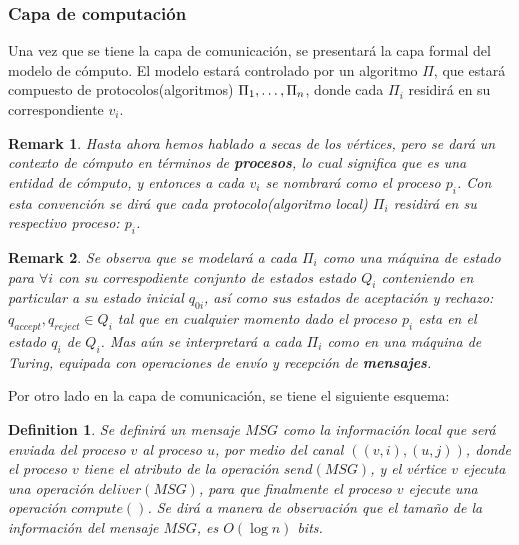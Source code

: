 \documentclass[10pt]{report}
\newtheorem*{remark}{Remark}
\newtheorem{definition}{Definition}
\begin{document}
    \subsubsection{Capa de computación}
    Una vez que se tiene la capa de comunicación, se presentará la capa formal del modelo de
    cómputo.\newline
    El modelo estará controlado por un algoritmo $\Pi$, que estará compuesto de protocolos(algoritmos)
    $\Pi_{1},\mathellipsis,\Pi_{n}$, donde cada $\Pi_{i}$ residirá en su correspondiente $v_{i}$.
    \newline
    \begin{remark}
        Hasta ahora hemos hablado a secas de los vértices, pero se dará un contexto
        de cómputo en términos de \textbf{procesos}, lo cual significa que es una entidad de cómputo, y entonces a cada $v_{i}$
        se nombrará como el proceso $p_{i}$.\newline
        Con esta convención se dirá que cada protocolo(algoritmo local) $\Pi_{i}$ residirá en su respectivo proceso:
        $p_{i}$.

    \end{remark}
        \begin{remark}
        Se observa que se modelará a cada $\Pi_{i}$ como una máquina de estado para $\forall i$ con su
        correspodiente conjunto de estados estado $Q_{i}$ conteniendo en particular a su estado inicial  $q_{0i}$, así como sus estados de
        aceptación y rechazo: $q_{accept},q_{reject}\in Q_{i}$ tal que en cualquier
        momento dado el proceso $p_{i}$ esta en el estado $q_{i}$ de $Q_{i}$.
        \space
        Mas aún se interpretará a cada $\Pi_{i}$ como en una máquina de Turing, equipada con operaciones de envío y
        recepción de \textbf{mensajes}.
    \end{remark}
    \newline
    Por otro lado en la capa de comunicación, se tiene el siguiente esquema:
    \newline
    \begin{definition}
        Se definirá un mensaje $MSG$ como la información local que será enviada del proceso $v$ al proceso $u$,
        por medio del canal $((v,i),(u,j))$, donde el proceso $v$ tiene el atributo de la operación $send(MSG)$, y el vértice
        $v$ ejecuta una operación $deliver(MSG)$, para que finalmente el proceso $v$ ejecute una operación $compute()$.
        \newline
        Se dirá a manera de observación que el tamaño de la información del mensaje $MSG$, es $O(\log n)$ bits.
    \end{definition}
\end{document}
